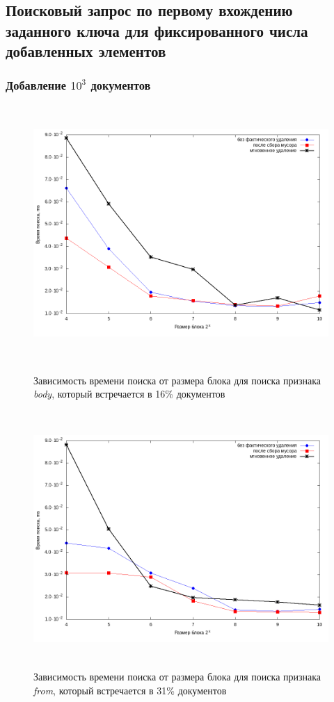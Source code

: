 \subsection{Поисковый запрос по первому вхождению заданного ключа для фиксированного числа добавленных элементов}

\subsubsection{Добавление $10^3$ документов}

\begin{figure}[H]
\includegraphics[width=\linewidth, height=9.75cm]{fig/limit_1/1e3/body.png}
\caption{Зависимость времени поиска от размера блока для поиска признака \textit{body}, который встречается в 16\% документов}
\includegraphics[width=\linewidth, height=9.75cm]{fig/limit_1/1e3/from.png}
\caption{Зависимость времени поиска от размера блока для поиска признака \textit{from}, который встречается в 31\% документов}
\end{figure}

